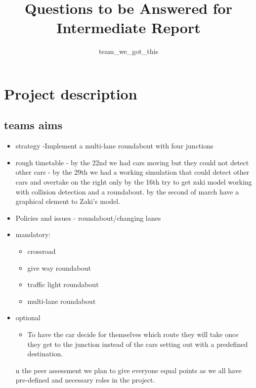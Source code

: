 \documentclass[]{article}
\title{Questions to be Answered for Intermediate Report}
\author{team\_we\_got\_this}
\begin{document}
\maketitle


\section*{Project description}

\subsection*{teams aims}
\begin{itemize}
	\item strategy -Implement a multi-lane roundabout with four junctions 
	\item rough timetable - by the 22nd we had cars moving but they could not detect other cars
	- by the 29th we had a working simulation that could detect other cars and overtake on the right only
	by the 16th try to get zaki model working with collision detection and a roundabout.
	by the second of march have a graphical element to Zaki's model. 
	\item Policies and issues - roundabout/changing lanes
	\item mandatory:
	\begin{itemize}
		\item crossroad
		\item give way roundabout
		\item traffic light roundabout
		\item multi-lane roundabout
	\end{itemize}
	\item optional
	\begin{itemize}
		\item To have the car decide for themselves which route they will take once they get to the junction instead of the cars setting out with a predefined destination. 
\end{itemize} 	
		n the peer assessment we plan to give everyone equal points as we all have pre-defined and necessary roles in the project. 
	
	\
\end{itemize}
 
 
\end{document}
